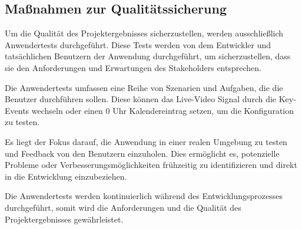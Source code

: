 \subsection{Maßnahmen zur Qualitätssicherung}
\label{sec:Qualitaetssicherung}
Um die Qualität des Projektergebnisses sicherzustellen, werden ausschließlich Anwendertests durchgeführt.
Diese Tests werden von dem Entwickler und tatsächlichen Benutzern der Anwendung durchgeführt, um sicherzustellen, dass sie den Anforderungen und Erwartungen des Stakeholders entsprechen.

Die Anwendertests umfassen eine Reihe von Szenarien und Aufgaben, die die Benutzer durchführen sollen.
Diese können \bspw das Live-Video Signal durch die Key-Events wechseln oder einen 0 Uhr Kalendereintrag setzen, um die Konfiguration zu testen.

Es liegt der Fokus darauf, die Anwendung in einer realen Umgebung zu testen und Feedback von den Benutzern einzuholen.
Dies ermöglicht es, potenzielle Probleme oder Verbesserungsmöglichkeiten frühzeitig zu identifizieren und direkt in die Entwicklung einzubeziehen.

Die Anwendertests werden kontinuierlich während des Entwicklungsprozesses durchgeführt, somit wird die Anforderungen und die Qualität des Projektergebnisses gewährleistet.


%
